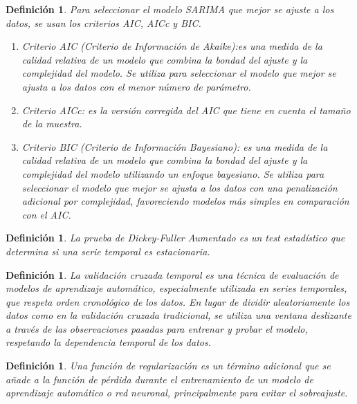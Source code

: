 \documentclass[12pt,twoside]{article}
\newtheorem{definition}[theorem]{Definición}
\begin{document}
\begin{definition} \label{def:criterios}
Para seleccionar el modelo SARIMA que mejor se ajuste a los datos, se usan los criterios AIC, AICc y BIC.

\begin{enumerate} 
    \item Criterio AIC (Criterio de Información de Akaike):es una medida de la calidad relativa de un modelo que combina la bondad del ajuste y la complejidad del modelo. Se utiliza para seleccionar el modelo que mejor se ajusta a los datos con el menor número de parámetro.
    \item Criterio AICc: es la versión corregida del AIC que tiene en cuenta el tamaño de la muestra.
    \item Criterio BIC (Criterio de Información Bayesiano): es una medida de la calidad relativa de un modelo que combina la bondad del ajuste y la complejidad del modelo utilizando un enfoque bayesiano. Se utiliza para seleccionar el modelo que mejor se ajusta a los datos con una penalización adicional por complejidad, favoreciendo modelos más simples en comparación con el AIC.
\end{enumerate}
\end{definition}

\begin{definition} \label{def:dickey}
La prueba de Dickey-Fuller Aumentado es un test estadístico que determina si una serie temporal es estacionaria.
\end{definition}

\begin{definition} \label{def:val}
La validación cruzada temporal es una técnica de evaluación de modelos de aprendizaje automático, especialmente utilizada en series temporales, que respeta orden cronológico de los datos. En lugar de dividir aleatoriamente los datos como en la validación cruzada tradicional, se utiliza una ventana deslizante a través de las observaciones pasadas para entrenar y probar el modelo, respetando la dependencia temporal de los datos. 
\end{definition}

\begin{definition} \label{def:regularizacion}
Una función de regularización es un término adicional que se añade a la función de pérdida durante el entrenamiento de un modelo de aprendizaje automático o red neuronal, principalmente para evitar el sobreajuste.
\end{definition}
\end{document}
